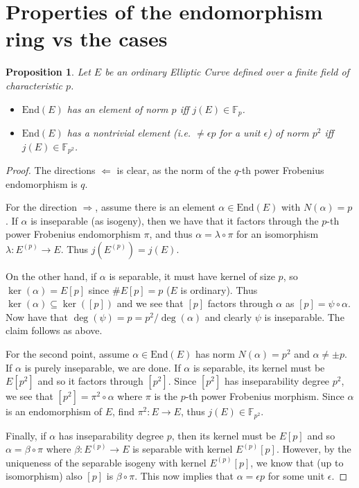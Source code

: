 \documentclass{scrartcl}
\newcommand{\F}{\mathbb{F}}
\newcommand{\End}{\mathrm{End}}
\newtheorem{prop}{Proposition}[section]
\theoremstyle{definition}
\begin{document}
\section{Properties of the endomorphism ring vs the cases}

\begin{prop}
    Let $E$ be an ordinary Elliptic Curve defined over a finite field of characteristic $p$.
    \begin{itemize}
        \item $\End(E)$ has an element of norm $p$ iff $j(E) \in \F_p$.
        \item $\End(E)$ has a nontrivial element (i.e. $\neq \epsilon p$ for a unit $\epsilon$) of norm $p^2$ iff $j(E) \in \F_{p^2}$. 
    \end{itemize}
\end{prop}
\begin{proof}
    The directions $\Leftarrow$ is clear, as the norm of the $q$-th power Frobenius endomorphism is $q$.

    For the direction $\Rightarrow$, assume there is an element $\alpha \in \End(E)$ with $N(\alpha) = p$.
    If $\alpha$ is inseparable (as isogeny), then we have that it factors through the $p$-th power Frobenius endomorphism $\pi$, and thus $\alpha = \lambda \circ \pi$ for an isomorphism $\lambda: E^{(p)} \to E$.
    Thus $j(E^{(p)}) = j(E)$.

    On the other hand, if $\alpha$ is separable, it must have kernel of size $p$, so $\ker(\alpha) = E[p]$ since $\#E[p] = p$ ($E$ is ordinary).
    Thus $\ker(\alpha) \subseteq \ker([p])$ and we see that $[p]$ factors through $\alpha$ as $[p] = \psi \circ \alpha$.
    Now have that $\deg(\psi) = p = p^2/\deg(\alpha)$ and clearly $\psi$ is inseparable.
    The claim follows as above.

    For the second point, assume $\alpha \in \End(E)$ has norm $N(\alpha) = p^2$ and $\alpha \neq \pm p$.
    If $\alpha$ is purely inseparable, we are done.
    If $\alpha$ is separable, its kernel must be $E[p^2]$ and so it factors through $[p^2]$.
    Since $[p^2]$ has inseparability degree $p^2$, we see that $[p^2] = \pi^2 \circ \alpha$ where $\pi$ is the $p$-th power Frobenius morphism.
    Since $\alpha$ is an endomorphism of $E$, find $\pi^2: E \to E$, thus $j(E) \in \F_{p^2}$.

    Finally, if $\alpha$ has inseparability degree $p$, then its kernel must be $E[p]$ and so $\alpha = \beta \circ \pi$ where $\beta: E^{(p)} \to E$ is separable with kernel $E^{(p)}[p]$.
    However, by the uniqueness of the separable isogeny with kernel $E^{(p)}[p]$, we know that (up to isomorphism) also $[p]$ is $\beta \circ \pi$.
    This now implies that $\alpha = \epsilon p$ for some unit $\epsilon$.
\end{proof}
\end{document}
